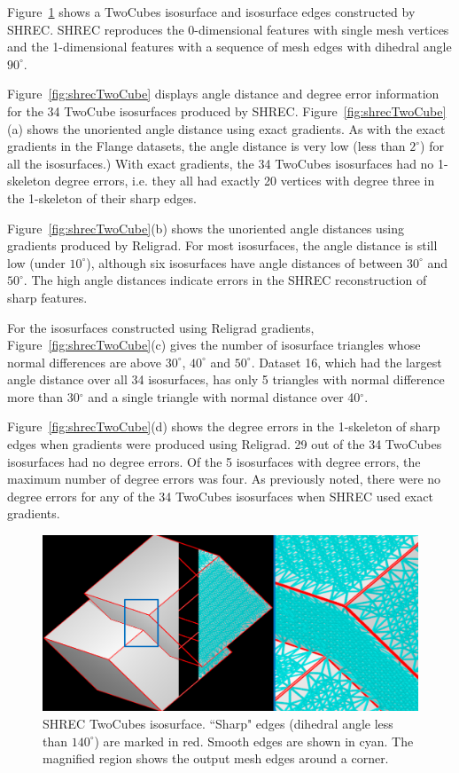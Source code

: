 Figure~\ref{fig:shrecPerfect1} shows a TwoCubes isosurface
and isosurface edges constructed by SHREC.
SHREC reproduces the 0-dimensional features with single mesh vertices
and the 1-dimensional features with a sequence of mesh edges
with dihedral angle $90^\circ$.

Figure~\ref{fig:shrecTwoCube} displays angle distance and degree error
information for the 34 TwoCube isosurfaces produced by SHREC.
Figure~\ref{fig:shrecTwoCube}(a) shows the unoriented angle distance
using exact gradients.
As with the exact gradients in the Flange datasets,
the angle distance is very low (less than $2^\circ$)
for all the isosurfaces.)
With exact gradients, the 34 TwoCubes isosurfaces 
had no 1-skeleton degree errors, 
i.e. they all had exactly 20 vertices with degree three 
in the 1-skeleton of their sharp edges.

Figure~\ref{fig:shrecTwoCube}(b) shows the unoriented angle distances
using gradients produced by Religrad.
For most isosurfaces, the angle distance is still low (under $10^\circ$),
although six isosurfaces have angle distances of between $30^\circ$
and $50^\circ$.
The high angle distances indicate errors in the SHREC reconstruction 
of sharp features.

For the isosurfaces constructed using Religrad gradients,
Figure~\ref{fig:shrecTwoCube}(c) gives
the number of isosurface triangles whose normal differences
are above $30^\circ$, $40^\circ$ and $50^\circ$.
Dataset 16, which had the largest angle distance over all 34 isosurfaces,
has only 5 triangles with normal difference more than 30$^\circ$ 
and a single triangle with normal distance over 40$^\circ$.  

Figure~\ref{fig:shrecTwoCube}(d) shows
the degree errors in the 1-skeleton of sharp edges
when gradients were produced using Religrad.
29 out of the 34 TwoCubes isosurfaces had no degree errors.
Of the 5 isosurfaces with degree errors,
the maximum number of degree errors was four.
As previously noted,
there were no degree errors for any of the 34 TwoCubes isosurfaces
when SHREC used exact gradients.

\begin{figure}[t]
	\includegraphics[width=\linewidth]{images/shrecPerfect.eps}
	\caption{SHREC TwoCubes isosurface. 
``Sharp" edges (dihedral angle less than $140^\circ$) are marked in red. 
Smooth edges are shown in cyan. The magnified region shows the output mesh edges around a corner.}
	\label{fig:shrecPerfect1}
\end{figure}

